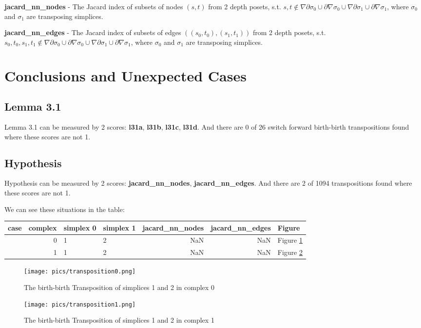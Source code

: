 \documentclass{article}
\begin{document}
\par \textbf{jacard\_nn\_nodes} -
The Jacard index of subsets of nodes $(s, t)$ from 2 depth posets, s.t.
$s, t \notin \nabla\partial\sigma_0 \cup \partial\nabla\sigma_0 \cup \nabla\partial\sigma_1 \cup \partial\nabla\sigma_1$,
where $\sigma_0$ and $\sigma_1$ are transposing simplices.


\par \textbf{jacard\_nn\_edges} -
The Jacard index of subsets of edges $((s_0, t_0), (s_1, t_1))$ from 2 depth posets, s.t.
$s_0, t_0, s_1, t_1 \notin \nabla\partial\sigma_0 \cup \partial\nabla\sigma_0 \cup \nabla\partial\sigma_1 \cup \partial\nabla\sigma_1$,
where $\sigma_0$ and $\sigma_1$ are transposing simplices.



\section{Conclusions and Unexpected Cases}

\subsection{Lemma 3.1}
\par Lemma 3.1 can be measured by 2 scores: \textbf{l31a}, \textbf{l31b}, \textbf{l31c}, \textbf{l31d}.
And there are 0 of 26 switch forward birth-birth transpositions found where these scores are not 1.

\subsection{Hypothesis}
\par Hypothesis can be measured by 2 scores: \textbf{jacard\_nn\_nodes}, \textbf{jacard\_nn\_edges}.
And there are 2 of 1094  transpositions found where these scores are not 1.
\par We can see these situations in the table:
\begin{center}\begin{tabular}{lrllrrl}
\toprule
case & complex & simplex 0 & simplex 1 & jacard\_nn\_nodes & jacard\_nn\_edges & Figure \\
\midrule
& 0 & 1 & 2 & NaN & NaN & Figure \ref{fig:unexpected0} \\
& 1 & 1 & 2 & NaN & NaN & Figure \ref{fig:unexpected1} \\
\bottomrule
\end{tabular}
\end{center}

\begin{figure}[ht]
\centering
\texttt{[image: pics/transposition0.png]}
\caption{The birth-birth Transposition of simplices 1 and 2 in complex 0}
\label{fig:unexpected0}
\end{figure}

\begin{figure}[ht]
\centering
\texttt{[image: pics/transposition1.png]}
\caption{The birth-birth Transposition of simplices 1 and 2 in complex 1}
\label{fig:unexpected1}
\end{figure}
\end{document}
